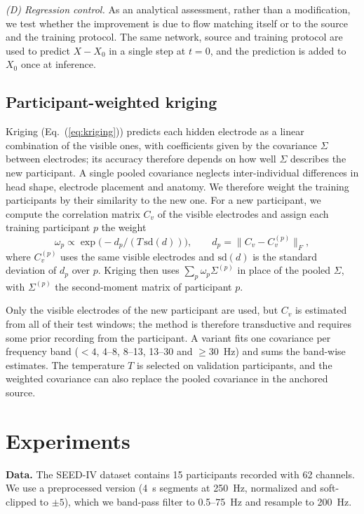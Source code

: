 \documentclass{article}
\begin{document}
\emph{(D) Regression control.} As an analytical assessment, rather than a
modification, we test whether the improvement is due to flow matching
itself or to the source and the training protocol. The same network,
source and training protocol are used to predict $X-X_0$ in a single step
at $t=0$, and the prediction is added to $X_0$ once at inference.

\subsection{Participant-weighted kriging}

Kriging (Eq.~(\ref{eq:kriging})) predicts each hidden electrode as a linear combination of
the visible ones, with coefficients given by the covariance $\Sigma$
between electrodes; its accuracy therefore depends on how well $\Sigma$
describes the new participant. A single pooled covariance neglects
inter-individual differences in head shape, electrode placement and
anatomy. We therefore weight the training participants by their
similarity to the new one. For a new participant, we compute the
correlation matrix $C_v$ of the visible electrodes and assign each
training participant $p$ the weight
\begin{equation}
\omega_p\propto\exp\!\big(-d_p/(T\,\mathrm{sd}(d))\big),\qquad
d_p=\|C_v-C^{(p)}_v\|_F,
\end{equation}
where $C^{(p)}_v$ uses the same visible electrodes and $\mathrm{sd}(d)$ is
the standard deviation of $d_p$ over $p$. Kriging then uses
$\sum_p\omega_p\Sigma^{(p)}$ in place of the pooled $\Sigma$, with
$\Sigma^{(p)}$ the second-moment matrix of participant $p$.

Only the visible electrodes of the new participant are used, but $C_v$ is
estimated from all of their test windows; the method is therefore
transductive and requires some prior recording from the participant. A
variant fits one covariance per frequency band ($<4$, 4--8, 8--13, 13--30
and $\geq$30~Hz) and sums the band-wise estimates. The temperature $T$ is
selected on validation participants, and the weighted covariance can also
replace the pooled covariance in the anchored source.

\section{Experiments}
\label{sec:experiments}

\textbf{Data.} The SEED-IV dataset \cite{zheng2019emotionmeter} contains 15
participants recorded with 62 channels. We use a preprocessed version
(4~s segments at 250~Hz, normalized and soft-clipped to $\pm5$), which we
band-pass filter to 0.5--75~Hz and resample to 200~Hz.
\end{document}
